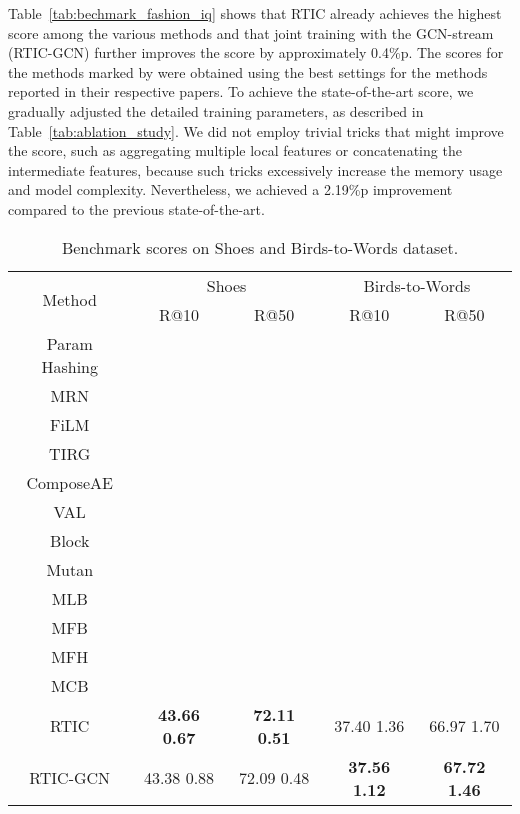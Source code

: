 \documentclass[10pt,twocolumn,letterpaper]{article}
\begin{document}
Table~\ref{tab:bechmark_fashion_iq} shows that RTIC already achieves the highest score among the various methods and that joint training with the GCN-stream (RTIC-GCN) further improves the score by approximately 0.4\%p. The scores for the methods marked by  were obtained using the best settings for the methods reported in their respective papers. To achieve the state-of-the-art score, we gradually adjusted the detailed training parameters, as described in Table~\ref{tab:ablation_study}. We did not employ trivial tricks that might improve the score, such as aggregating multiple local features or concatenating the intermediate features, because such tricks excessively increase the memory usage and model complexity. Nevertheless, we achieved a 2.19\%p improvement compared to the previous state-of-the-art.

    
\begin{table}[h]
    \caption{Benchmark scores on Shoes and Birds-to-Words dataset.}
    \centering
    \begin{adjustbox}{width=0.48\textwidth}
    \begin{tabular}{ccccc}
        \toprule
        \multirow{2}{*}{Method} & \multicolumn{2}{c}{Shoes} & \multicolumn{2}{c}{Birds-to-Words} \\ \cline{2-5}
        & R@10 & R@50 & R@10 & R@50 \\
        \hline \hline
        Param Hashing &  &  &  &  \\
        MRN &  &  &  &  \\
        FiLM &  &  &  &  \\
        TIRG &  &  &  &  \\
        ComposeAE &  &  &  &  \\
        VAL &  &  &  &  \\
        \hline
        Block &  &  &  &  \\
        Mutan &  &  &  &  \\
        MLB &  &  &  &  \\
        MFB &  &  &  &  \\
        MFH &  &  &  &  \\
        MCB &  &  &  &  \\
        \hline
        RTIC & \textbf{43.66}  \textbf{0.67} & \textbf{72.11}  \textbf{0.51} & 37.40  1.36 & 66.97  1.70 \\
        RTIC-GCN & 43.38  0.88 & 72.09  0.48 & \textbf{37.56}  \textbf{1.12} & \textbf{67.72}  \textbf{1.46} \\
        \bottomrule
    \end{tabular}
    \end{adjustbox}
    \label{tab:bechmark_shoes_birds}
    \end{table}
\end{document}
